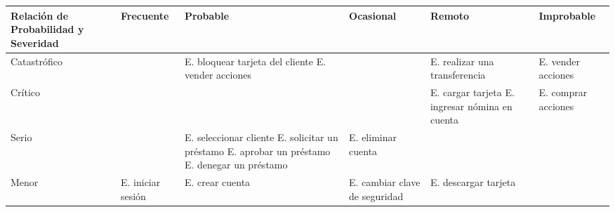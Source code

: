 \begin{adjustwidth}{0cm}{-8cm}
	\begin{multicols}{2}
		\begin{table}[H]
			\fontsize{8}{9}\selectfont
			\centering
			\begin{tabularx}{0.7\textwidth}{|>{\centering}X|>{\centering}X|>{\centering}X|>{\centering}X|>{\centering}X|X|}
				\hline
				Relación de Probabilidad y Severidad & Frecuente                                         & Probable                                                                          & Ocasional                                             & Remoto                                                                       & Improbable                                \\
				\hline
				Catastrófico                         & \cellcolor{riskred}                               & \cellcolor{riskred}   E. bloquear tarjeta del cliente \newline E. vender acciones & \cellcolor{riskred}                                   & \cellcolor{riskyellow} E. realizar una transferencia                         & \cellcolor{riskgreen} E. vender acciones  \\
				\hline
				Crítico                              & \cellcolor{riskred}                               & \cellcolor{riskred}                                                               & \cellcolor{riskyellow}                                & \cellcolor{riskgreen} E. cargar tarjeta \newline	E. ingresar nómina en cuenta & \cellcolor{riskpurple}E. comprar acciones \\
				\hline
				Serio                                & \cellcolor{riskyellow}                            & \cellcolor{riskyellow} E. seleccionar cliente\newline
				E. solicitar un préstamo\newline
				E. aprobar un préstamo\newline
				E. denegar un préstamo\newline       & \cellcolor{riskgreen} E. eliminar cuenta          & \cellcolor{riskpurple}                                                            & \cellcolor{riskblue}                                                                                                                                                             \\
				\hline
				Menor                                & \cellcolor{riskgreen} E. iniciar sesión           & \cellcolor{riskgreen}E. crear cuenta                                              & \cellcolor{riskpurple}E. cambiar clave de seguridad   & \cellcolor{riskblue} E. descargar tarjeta\newline

\end{tabularx}
\end{table}
\end{multicols}
\end{adjustwidth}
